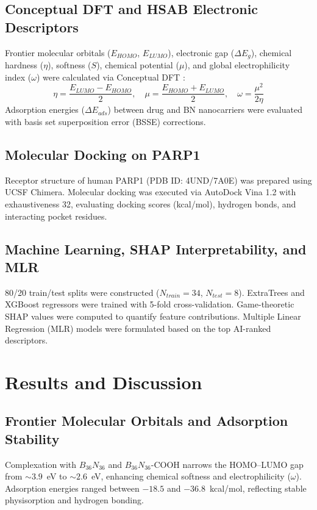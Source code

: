 \documentclass[10pt,a4paper]{article}
\begin{document}
\subsection{Conceptual DFT and HSAB Electronic Descriptors}
Frontier molecular orbitals ($E_{HOMO}$, $E_{LUMO}$), electronic gap ($\Delta E_g$), chemical hardness ($\eta$), softness ($S$), chemical potential ($\mu$), and global electrophilicity index ($\omega$) were calculated via Conceptual DFT \cite{Parr1999, Chattaraj2009}:
\begin{equation}
\eta = \frac{E_{LUMO} - E_{HOMO}}{2}, \quad \mu = \frac{E_{HOMO} + E_{LUMO}}{2}, \quad \omega = \frac{\mu^2}{2\eta}
\end{equation}
Adsorption energies ($\Delta E_{ads}$) between drug and BN nanocarriers were evaluated with basis set superposition error (BSSE) corrections.

\subsection{Molecular Docking on PARP1}
Receptor structure of human PARP1 (PDB ID: 4UND/7A0E) was prepared using UCSF Chimera. Molecular docking was executed via AutoDock Vina 1.2 \cite{Trott2010} with exhaustiveness 32, evaluating docking scores (kcal/mol), hydrogen bonds, and interacting pocket residues.

\subsection{Machine Learning, SHAP Interpretability, and MLR}
80/20 train/test splits were constructed ($N_{train}=34$, $N_{test}=8$). ExtraTrees and XGBoost regressors were trained with 5-fold cross-validation. Game-theoretic SHAP values \cite{Lundberg2017} were computed to quantify feature contributions. Multiple Linear Regression (MLR) models were formulated based on the top AI-ranked descriptors.

\section{Results and Discussion}
\subsection{Frontier Molecular Orbitals and Adsorption Stability}
Complexation with $B_{36}N_{36}$ and $B_{36}N_{36}\text{-COOH}$ narrows the HOMO--LUMO gap from $\sim 3.9$~eV to $\sim 2.6$~eV, enhancing chemical softness and electrophilicity ($\omega$). Adsorption energies ranged between $-18.5$ and $-36.8$~kcal/mol, reflecting stable physisorption and hydrogen bonding.
\end{document}
